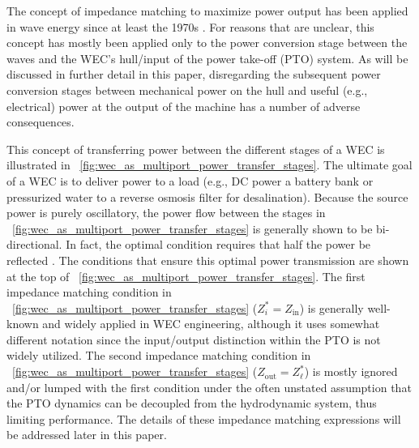 \documentclass[twocolumn]{autart}
\begin{document}
The concept of impedance matching to maximize power output has been applied in wave energy since at least the 1970s \cite{Falnes:1980aa}.
For reasons that are unclear, this concept has mostly been applied only to the power conversion stage between the waves and the WEC's hull/input of the power take-off (PTO) system. 
As will be discussed in further detail in this paper, disregarding the subsequent power conversion stages between mechanical power on the hull and useful (e.g., electrical) power at the output of the machine has a number of adverse consequences.

This concept of transferring power between the different stages of a WEC is illustrated in  \figurename~\ref{fig:wec_as_multiport_power_transfer_stages}.
The ultimate goal of a WEC is to deliver power to a load (e.g., DC power a battery bank or pressurized water to a reverse osmosis filter for desalination).
Because the source power is purely oscillatory, the power flow between the stages in \figurename~\ref{fig:wec_as_multiport_power_transfer_stages} is generally shown to be bi-directional.
In fact, the optimal condition requires that half the power be reflected \cite{Evans1976}.
The conditions that ensure this optimal power transmission are shown at the top of \figurename~\ref{fig:wec_as_multiport_power_transfer_stages}.
The first impedance matching condition in \figurename~\ref{fig:wec_as_multiport_power_transfer_stages} ($Z_i^* = Z_{\textrm{in}}$) is generally well-known and widely applied in WEC engineering, although it uses somewhat different notation since the input/output distinction within the PTO is not widely utilized. 
The second impedance matching condition in \figurename~\ref{fig:wec_as_multiport_power_transfer_stages} ($Z_{\textrm{out}} = Z_\ell^*$) is mostly ignored and/or lumped with the first condition under the often unstated assumption that the PTO dynamics can be decoupled from the hydrodynamic system, thus limiting performance.
The details of these impedance matching expressions will be addressed later in this paper.
\end{document}
